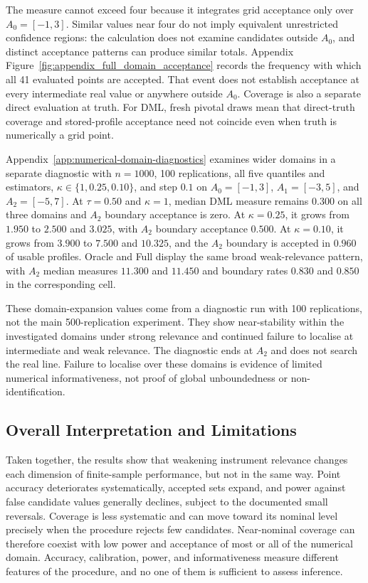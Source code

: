 The measure cannot exceed four because it integrates grid acceptance only over $A_0=[-1,3]$. Similar values near four do not imply equivalent unrestricted confidence regions: the calculation does not examine candidates outside $A_0$, and distinct acceptance patterns can produce similar totals. Appendix Figure~\ref{fig:appendix_full_domain_acceptance} records the frequency with which all 41 evaluated points are accepted. That event does not establish acceptance at every intermediate real value or anywhere outside $A_0$. Coverage is also a separate direct evaluation at truth. For DML, fresh pivotal draws mean that direct-truth coverage and stored-profile acceptance need not coincide even when truth is numerically a grid point.

Appendix~\ref{app:numerical-domain-diagnostics} examines wider domains in a separate diagnostic with $n=1000$, 100 replications, all five quantiles and estimators, $\kappa\in\{1,0.25,0.10\}$, and step $0.1$ on $A_0=[-1,3]$, $A_1=[-3,5]$, and $A_2=[-5,7]$. At $\tau=0.50$ and $\kappa=1$, median DML measure remains $0.300$ on all three domains and $A_2$ boundary acceptance is zero. At $\kappa=0.25$, it grows from $1.950$ to $2.500$ and $3.025$, with $A_2$ boundary acceptance $0.500$. At $\kappa=0.10$, it grows from $3.900$ to $7.500$ and $10.325$, and the $A_2$ boundary is accepted in $0.960$ of usable profiles. Oracle and Full display the same broad weak-relevance pattern, with $A_2$ median measures $11.300$ and $11.450$ and boundary rates $0.830$ and $0.850$ in the corresponding cell.

These domain-expansion values come from a diagnostic run with 100 replications, not the main 500-replication experiment. They show near-stability within the investigated domains under strong relevance and continued failure to localise at intermediate and weak relevance. The diagnostic ends at $A_2$ and does not search the real line. Failure to localise over these domains is evidence of limited numerical informativeness, not proof of global unboundedness or non-identification.

\FloatBarrier

\subsection{Overall Interpretation and Limitations}
\label{sec:results-overall-interpretation}

Taken together, the results show that weakening instrument relevance changes each dimension of finite-sample performance, but not in the same way. Point accuracy deteriorates systematically, accepted sets expand, and power against false candidate values generally declines, subject to the documented small reversals. Coverage is less systematic and can move toward its nominal level precisely when the procedure rejects few candidates. Near-nominal coverage can therefore coexist with low power and acceptance of most or all of the numerical domain. Accuracy, calibration, power, and informativeness measure different features of the procedure, and no one of them is sufficient to assess inference.

